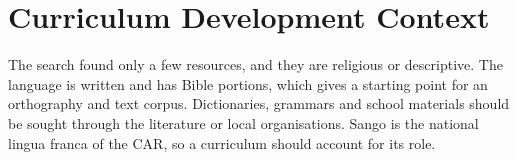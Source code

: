 \documentclass[12pt]{article}
\begin{document}
\section{Curriculum Development Context}
The search found only a few resources, and they are religious or descriptive. The language is written and has Bible portions, which gives a starting point for an orthography and text corpus. Dictionaries, grammars and school materials should be sought through the literature or local organisations. Sango is the national lingua franca of the CAR, so a curriculum should account for its role.
\end{document}
